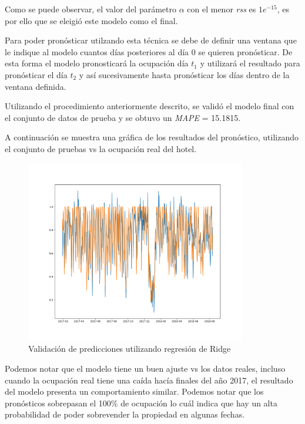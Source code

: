 Como se puede observar, el valor del parámetro $\alpha$ con el menor \emph{rss} es $1e^{-15}$, es por ello que se eleigió este modelo como el final. 

Para poder pronósticar utilzando esta técnica se debe de definir una ventana que le indique al modelo cuantos días posteriores al día 0 se quieren pronósticar. De esta forma el modelo pronosticará la ocupación día $t_1$ y utilizará el resultado para pronósticar el día $t_2$ y así sucesivamente hasta pronósticar los días dentro de la ventana definida.

Utilizando el procedimiento anteriormente descrito, se validó el modelo final con el conjunto de datos de prueba y se obtuvo un \emph{MAPE} = 15.1815.

A continuación se muestra una gráfica de los resultados del pronóstico, utilizando el conjunto de pruebas vs la ocupación real del hotel.

\begin{figure}[H]
  \centering
      \includegraphics[width=\maxwidth,height=8cm]{figures/RidgeTest.png}    
  \caption{Validación de predicciones utilizando regresión de Ridge}
\end{figure}

Podemos notar que el modelo tiene un buen ajuste vs los datos reales, incluso cuando la ocupación real tiene una caída hacía finales del año 2017, el resultado del modelo presenta un comportamiento similar. Podemos notar que los pronósticos sobrepasan el 100\% de ocupación lo cuál indica que hay un alta probabilidad de poder sobrevender la propiedad en algunas fechas.

